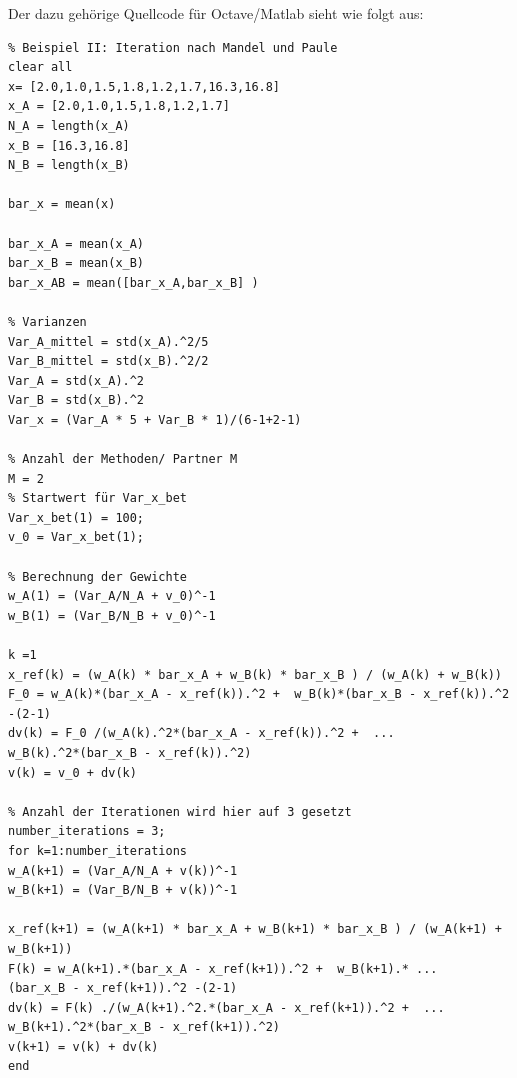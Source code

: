 \newpage
Der dazu gehörige Quellcode für Octave/Matlab sieht wie folgt aus: 
\begin{verbatim}
% Beispiel II: Iteration nach Mandel und Paule
clear all
x= [2.0,1.0,1.5,1.8,1.2,1.7,16.3,16.8]
x_A = [2.0,1.0,1.5,1.8,1.2,1.7]
N_A = length(x_A)
x_B = [16.3,16.8]
N_B = length(x_B)

bar_x = mean(x)

bar_x_A = mean(x_A)
bar_x_B = mean(x_B)
bar_x_AB = mean([bar_x_A,bar_x_B] )

% Varianzen
Var_A_mittel = std(x_A).^2/5
Var_B_mittel = std(x_B).^2/2
Var_A = std(x_A).^2
Var_B = std(x_B).^2
Var_x = (Var_A * 5 + Var_B * 1)/(6-1+2-1)

% Anzahl der Methoden/ Partner M
M = 2
% Startwert für Var_x_bet
Var_x_bet(1) = 100;
v_0 = Var_x_bet(1);

% Berechnung der Gewichte
w_A(1) = (Var_A/N_A + v_0)^-1
w_B(1) = (Var_B/N_B + v_0)^-1

k =1
x_ref(k) = (w_A(k) * bar_x_A + w_B(k) * bar_x_B ) / (w_A(k) + w_B(k))
F_0 = w_A(k)*(bar_x_A - x_ref(k)).^2 +  w_B(k)*(bar_x_B - x_ref(k)).^2 -(2-1)
dv(k) = F_0 /(w_A(k).^2*(bar_x_A - x_ref(k)).^2 +  ...
w_B(k).^2*(bar_x_B - x_ref(k)).^2)
v(k) = v_0 + dv(k)

% Anzahl der Iterationen wird hier auf 3 gesetzt
number_iterations = 3;
for k=1:number_iterations
w_A(k+1) = (Var_A/N_A + v(k))^-1
w_B(k+1) = (Var_B/N_B + v(k))^-1

x_ref(k+1) = (w_A(k+1) * bar_x_A + w_B(k+1) * bar_x_B ) / (w_A(k+1) + w_B(k+1))
F(k) = w_A(k+1).*(bar_x_A - x_ref(k+1)).^2 +  w_B(k+1).* ...
(bar_x_B - x_ref(k+1)).^2 -(2-1)
dv(k) = F(k) ./(w_A(k+1).^2.*(bar_x_A - x_ref(k+1)).^2 +  ...
w_B(k+1).^2*(bar_x_B - x_ref(k+1)).^2)
v(k+1) = v(k) + dv(k)
end
\end{verbatim}


